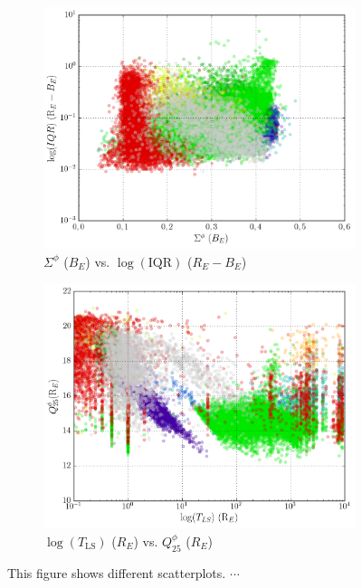 \begin{figure}[h]
\begin{subfigure}[t]{0.49\textwidth}
		\centering
		\caption{$\Sigma^\phi$ ($B_E$) vs. $\log(\text{IQR})$ ($R_E - B_E$)}
		\label{fig:2e}
		\includegraphics[width=\textwidth]{figures/scatterplots/B-phase-cs-R-B-IQR.png}		
	\end{subfigure}
	\begin{subfigure}[t]{0.49\textwidth}
		\centering
		\caption{$\log(T_{\text{LS}})$ ($R_E$) vs. $Q_{25}^\phi$ ($R_E$)}
		\label{fig:2f}
		\includegraphics[width=\textwidth]{figures/scatterplots/R-ls-period-R-phase-q25.png}		
	\end{subfigure}
	\caption{This figure shows different scatterplots. $\cdots$\\}
	\label{fig:2}
\end{figure}

